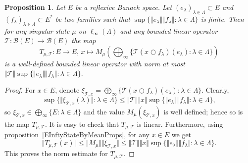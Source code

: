 \documentclass[12pt]{article}
\newtheorem{proposition}[theorem]{Proposition}
\begin{document}
\begin{proposition}\label{TUTMapIsLinAndBnd}
    Let $E$ be a reflexive Banach space. 
    Let ${(e_\lambda)}_{\lambda\in\Lambda}\subset E$ 
    and ${(f_\lambda)}_{\lambda\in\Lambda}\subset E^*$ be two families such
    that $\sup\{\Vert e_\lambda\Vert\Vert f_\lambda\Vert: \lambda\in\Lambda\}$ 
    is finite. Then for any singular state $\mu$ on $\ell_\infty(\Lambda)$ and 
    any bounded linear operator $\mathcal{T}:\mathcal{B}(E)\to\mathcal{B}(E)$ the 
    map
    \[
        T_{\mu,\mathcal{T}}: 
        E\to E,\, 
        x\mapsto M_{\mu}\left(
            \bigoplus\nolimits_{\infty}\{ 
                \mathcal{T}(x\bigcirc f_\lambda)(e_\lambda) : \lambda\in\Lambda 
            \}
        \right)
    \]
    is a well-defined bounded linear operator with norm at 
    most 
    $
        \Vert \mathcal{T} \Vert
        \sup\{ \Vert e_\lambda\Vert \Vert f_\lambda\Vert : \lambda\in\Lambda\}.
    $
\end{proposition}
\begin{proof}
    For $x\in E$, denote 
    $
        \xi_{\mathcal{T},x}=\bigoplus\nolimits_{\infty}\{ 
            \mathcal{T}(x\bigcirc f_\lambda)(e_\lambda) : \lambda\in\Lambda 
        \}.
    $ 
    Clearly, 
    \[
        \sup\{\Vert \xi_{\mathcal{T},x}(\lambda)\Vert:\lambda\in\Lambda\}
        \leq
        \Vert \mathcal{T}\Vert \Vert x\Vert
        \sup\{ \Vert e_\lambda\Vert \Vert f_\lambda\Vert : \lambda\in\Lambda\},
    \]
    so 
    $
        \xi_{\mathcal{T},x}\in
            \bigoplus\nolimits_{\infty}{}\{E:\lambda\in\Lambda\}
    $ 
    and the value $M_{\mu}(\xi_{\mathcal{T},x})$ is well defined; hence so is 
    the map $T_{\mu,\mathcal{T}}$. It is easy to check 
    that $T_{\mu,\mathcal{T}}$ is linear. Furthermore, using 
    proposition~\ref{EInftyStateByMeanProps}, for any $x\in E$
    we get
    \[
        \Vert T_{\mu,\mathcal{T}}(x)\Vert
        \leq\Vert M_{\mu}\Vert\Vert \xi_{\mathcal{T},x}\Vert
        \leq\Vert \mathcal{T}\Vert \Vert x\Vert
        \sup\{ \Vert e_\lambda\Vert \Vert f_\lambda\Vert : \lambda\in\Lambda\}.
    \] 
    This proves the norm estimate for $T_{\mu,\mathcal{T}}$.
\end{proof}
\end{document}
